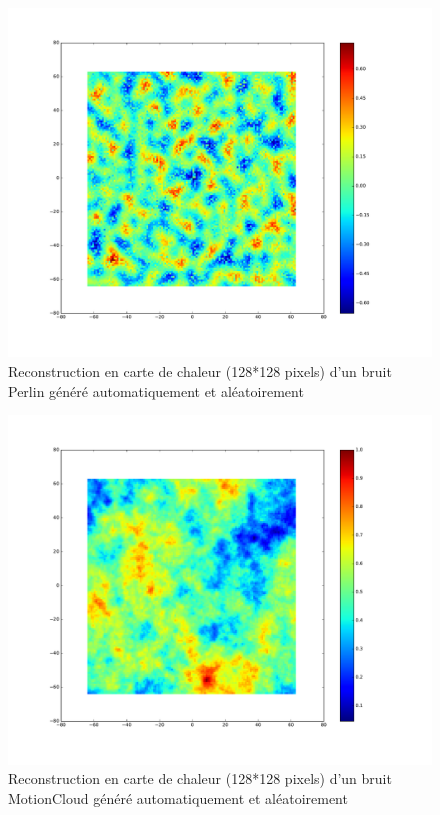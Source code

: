 \begin{figure}[th]
\centering
\includegraphics[scale=0.4]{Figures/perlin_noise}
\decoRule
\caption[Figure]{Reconstruction en carte de chaleur (128*128 pixels) d'un bruit Perlin généré automatiquement et aléatoirement \autocite{Perlin1985}}
\label{fig:perlin_noise}
\end{figure}

\begin{figure}[th]
\centering
\includegraphics[scale=0.4]{Figures/motioncloud_noise}
\decoRule
\caption[Figure]{Reconstruction en carte de chaleur (128*128 pixels) d'un bruit MotionCloud généré automatiquement et aléatoirement \autocite{Leon2012}}
\label{fig:motioncloud_noise}
\end{figure}


